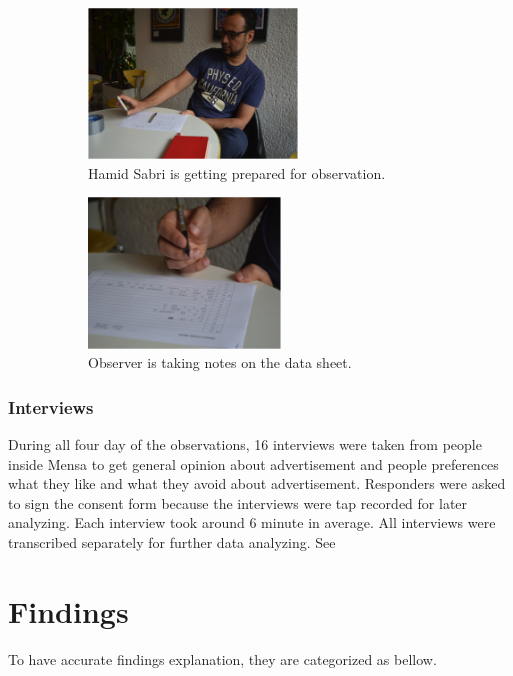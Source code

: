 \begin{figure}[H]
    \centering
    \begin{subfigure}[H]{0.45\textwidth}
        \centering
        \includegraphics[width=\textwidth,height=4cm]{Figures/3/hamid}
        \caption{Hamid Sabri is getting prepared for observation.}
        \label{fig:hamid}
    \end{subfigure}
    \hfill
    \begin{subfigure}[H]{0.45\textwidth}
        \centering
        \includegraphics[width=\textwidth,height=4cm]{Figures/3/observer}
        \caption{Observer is taking notes on the data sheet.}
        \label{fig:Observer}
    \end{subfigure}
    \caption{}
    \label{fig:observation_env}
\end{figure}


\subsubsection{Interviews}

During all four day of the observations, 16 interviews were taken from people inside Mensa to get general opinion about advertisement and people preferences what they like and what they avoid about advertisement. Responders were asked to sign the consent form because the interviews were tap recorded for later analyzing.  Each interview took around 6 minute in average. All interviews were transcribed separately for further data analyzing.
See 

\section{Findings}
To have accurate findings explanation, they are categorized as bellow.

